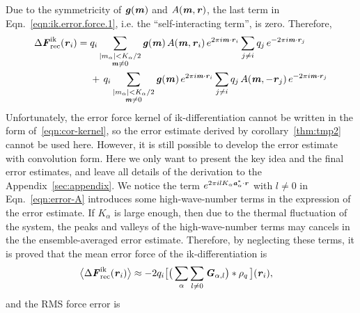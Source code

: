 \documentclass[aps,pre,preprint]{revtex4}
\renewcommand{\v}[1]{\textbf{\textit{#1}}}
\begin{document}
Due to the symmetricity of $\v g(\v m)$ and $A(\v m, \v r)$,
the last term in Eqn.~\eqref{eqn:ik.error.force.1},
i.e. the ``self-interacting term'', is zero.
Therefore,
\begin{align}\nonumber
  \Delta\v F_{\textrm{rec}}^{\textrm{ik}}(\v r_i)
  =\;&
  q_i
  \sum_{
    \begin{subarray}{c}
      \vert m_{\alpha}\vert < K_\alpha/2\\
      \v m\neq 0
    \end{subarray}}
  \v g(\v m)\,
  A(\v m, \v r_i)\,
  e^{2\pi i\v m\cdot \v r_i}
  \sum_{j\neq i}q_j\,e^{-2\pi i\v m\cdot\v r_j} \\\label{eqn:ik.error.force}
  & +\,
  q_i
  \sum_{
    \begin{subarray}{c}
      \vert m_{\alpha}\vert < K_\alpha/2\\
      \v m\neq 0
    \end{subarray}}
  \v g(\v m)\,
  e^{2\pi i\v m\cdot \v r_i}
  \sum_{j\neq i}q_j\,A(\v m, -\v r_j)\,e^{-2\pi i\v m\cdot\v r_j}
\end{align}
Unfortunately, the
error force kernel of ik-differentiation
cannot be written
in the form of~\eqref{eqn:cor-kernel}, so the error estimate derived by
corollary~\ref{thm:tmp2} cannot be used here. However, it is still
possible to develop the error estimate with convolution form.
Here we only want to present the key idea and the final  error
estimates, and leave all details of the derivation 
to the Appendix~\ref{sec:appendix}.  We notice the
term $e^{2\pi i l K_\alpha\v a^\ast_\alpha\cdot\v r}$ with $l\neq 0$
in Eqn.~\eqref{eqn:error-A} introduces some high-wave-number terms in
the expression of the error estimate.  If $K_\alpha$ is large enough,
then due to the thermal fluctuation of the system, the peaks and
valleys of the high-wave-number terms may cancels in the the
ensemble-averaged error estimate.
Therefore, by neglecting these terms, it is proved that the mean error
force of the ik-differentiation is
\begin{align}\label{eqn:ik.meanf}
  \big\langle
  \Delta\v F_{\textrm{rec}}^{\textrm{ik}}(\v r_i)
  \big\rangle
  & \approx
  - 2 q_i
  \big[
  \big(
  \sum_{\alpha}\sum_{l\neq 0}\v G_{\alpha,l}
  \big)
  \ast\rho_q\,
  \big] (\v r_i),
\end{align}
and the RMS force error is 
\end{document}

